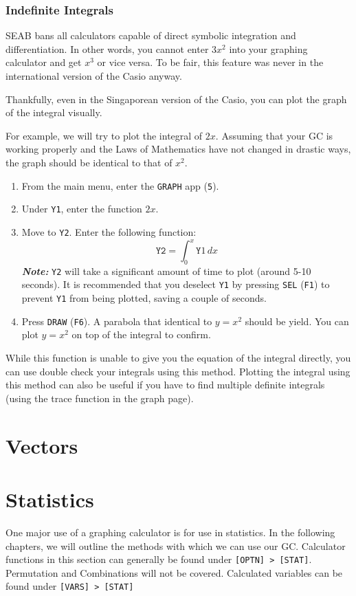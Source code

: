 \documentclass[a5paper,draft]{memoir}
\def\code#1{\texttt{#1}}
\def\note#1{\textbf{\textit{Note:}} #1}
\begin{document}
\subsection{Indefinite Integrals}
SEAB bans all calculators capable of direct symbolic integration and differentiation. In other words, you cannot enter $3x^2$ into your graphing calculator and get $x^3$ or vice versa. To be fair, this feature was never in the international version of the Casio anyway.

Thankfully, even in the Singaporean version of the Casio, you can plot the graph of the integral visually.

For example, we will try to plot the integral of $2x$. Assuming that your GC is working properly and the Laws of Mathematics have not changed in drastic ways, the graph should be identical to that of $x^2$.

\begin{enumerate}
	\item From the main menu, enter the \code{GRAPH} app (\code{5}).
	\item Under \code{Y1}, enter the function $2x$.
	\item Move to \code{Y2}. Enter the following function:
	\begin{equation*}
	\code{Y2}=\int_{0}^{x} \code{Y}1 \, dx
	\end{equation*}
	\note{\code{Y2} will take a significant amount of time to plot (around 5-10 seconds). It is recommended that you deselect \code{Y1} by pressing \code{SEL} (\code{F1}) to prevent \code{Y1} from being plotted, saving a couple of seconds.}
	\item Press \code{DRAW} (\code{F6}). A parabola that identical to $y=x^2$ should be yield. You can plot $y=x^2$ on top of the integral to confirm.
\end{enumerate}

While this function is unable to give you the equation of the integral directly, you can use double check your integrals using this method. Plotting the integral using this method can also be useful if you have to find multiple definite integrals (using the trace function in the graph page).

\chapter{Vectors} \label{vectors}

\chapter{Statistics}
One major use of a graphing calculator is for use in statistics. In the following chapters, we will outline the methods with which we can use our GC. Calculator functions in this section can generally be found under \code{[OPTN] > [STAT]}. Permutation and Combinations will not be covered. Calculated variables can be found under \code{[VARS] > [STAT]}
\end{document}
